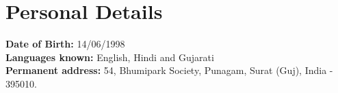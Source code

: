 \documentclass[]{jaydeep-resume-openfont}
\begin{document}
\begin{minipage}[t]{0.70\textwidth}


\section{Personal Details}
\textbullet{} \textbf{Date of Birth:} 14/06/1998 \\
\textbullet{} \textbf{Languages known:} English, Hindi and Gujarati\\
\textbullet{} \textbf{Permanent address:} 54, Bhumipark Society, Punagam, Surat (Guj), India - 395010.
\sectionsep

\end{minipage}
\end{document}
